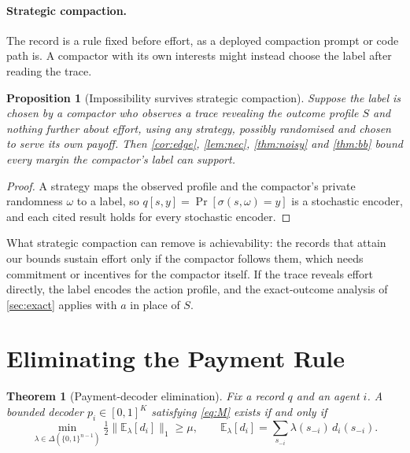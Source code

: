 \documentclass[sigconf,anonymous,acmthm=false]{aamas}
\theoremstyle{acmplain}
\newtheorem{theorem}{Theorem}
\newtheorem{proposition}{Proposition}
\theoremstyle{acmdefinition}
\newcommand{\E}{\mathbb{E}}
\newcommand{\cube}{\{0,1\}}
\begin{document}
\paragraph{Strategic compaction.} The record is a rule fixed before effort, as a deployed
compaction prompt or code path is. A compactor with its own interests might instead choose
the label after reading the trace.

\begin{proposition}[Impossibility survives strategic compaction]\label{prop:strategic}
Suppose the label is chosen by a compactor who observes a trace revealing the outcome profile
$S$ and nothing further about effort, using any strategy, possibly randomised and chosen to
serve its own payoff. Then \cref{cor:edge}, \cref{lem:nec}, \cref{thm:noisy} and
\cref{thm:bb} bound every margin the compactor's label can support.
\end{proposition}
\begin{proof}
A strategy maps the observed profile and the compactor's private randomness $\omega$ to a
label, so $q[s,y]=\Pr[\sigma(s,\omega)=y]$ is a stochastic encoder, and each cited result
holds for every stochastic encoder.
\end{proof}

What strategic compaction can remove is achievability: the records that attain our bounds
sustain effort only if the compactor follows them, which needs commitment or incentives for
the compactor itself. If the trace reveals effort directly, the label encodes the action
profile, and the exact-outcome analysis of \cref{sec:exact} applies with $a$ in place of $S$.

\section{Eliminating the Payment Rule}\label{sec:elim}

\begin{theorem}[Payment-decoder elimination]\label{thm:elim}
Fix a record $q$ and an agent $i$. A bounded decoder $p_i\in[0,1]^K$ satisfying
\eqref{eq:M} exists if and only if
\[ \min_{\lambda\in\Delta(\cube^{n-1})}\tfrac12\big\|\E_\lambda[d_i]\big\|_1\ge\mu,
\qquad\E_\lambda[d_i]=\textstyle\sum_{s_{-i}}\lambda(s_{-i})\,d_i(s_{-i}). \]
\end{theorem}
\end{document}
